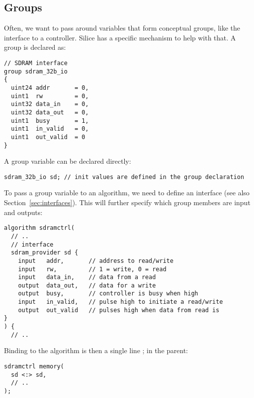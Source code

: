 \documentclass[a4]{article}
\newcommand\silice{Silice}
\begin{document}

\subsection{Groups}
\label{sec:groups}

Often, we want to pass around variables that form conceptual groups, like the interface to a controller. \silice{} has a specific mechanism to help with that. A group is declared as:

\begin{verbatim}
// SDRAM interface
group sdram_32b_io
{
  uint24 addr       = 0,
  uint1  rw         = 0,
  uint32 data_in    = 0,
  uint32 data_out   = 0,
  uint1  busy       = 1,
  uint1  in_valid   = 0,
  uint1  out_valid  = 0
}
\end{verbatim}

A group variable can be declared directly:
\begin{verbatim}
sdram_32b_io sd; // init values are defined in the group declaration
\end{verbatim}

To pass a group variable to an algorithm, we need to define an interface (see also Section~\ref{sec:interfaces}). This will further specify which group members are input and outputs:

\begin{verbatim}
algorithm sdramctrl(
  // ..
  // interface
  sdram_provider sd {
    input   addr,       // address to read/write
    input   rw,         // 1 = write, 0 = read
    input   data_in,    // data from a read
    output  data_out,   // data for a write
    output  busy,       // controller is busy when high
    input   in_valid,   // pulse high to initiate a read/write
    output  out_valid   // pulses high when data from read is
}    
) {
  // ..
\end{verbatim}

Binding to the algorithm is then a single line ; in the parent:

\begin{verbatim}
sdramctrl memory(
  sd <:> sd,
  // ..
);
\end{verbatim}

\vspace*{5mm}
\noindent
{}
    
\end{document}
